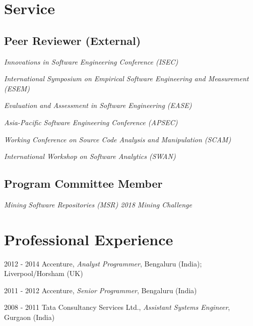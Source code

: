 \documentclass[12pt,letterpaper]{article}
\newcommand{\listitemspace}{0.15em}
\renewenvironment{itemize}
{\begin{list}{}{\setlength{\leftmargin}{0em}
				\setlength{\parskip}{0em}
				\setlength{\itemsep}{\listitemspace}
				\setlength{\parsep}{\listitemspace}}}
{\end{list}}
\begin{document}
\section*{Service}

\subsection*{Peer Reviewer (External)}

\begin{itemize}
	
	\item \textit{Innovations in Software Engineering Conference (ISEC)}
	\item \textit{International Symposium on Empirical Software Engineering and Measurement (ESEM)}
	\item \textit{Evaluation and Assessment in Software Engineering (EASE)}
	\item  \textit{Asia-Pacific Software Engineering Conference (APSEC)}	
	\item  \textit{Working Conference on Source Code Analysis and Manipulation (SCAM)}		
	\item  \textit{International Workshop on Software Analytics (SWAN)}
	
	
\end{itemize}

\subsection*{Program Committee Member}
\begin{itemize}
	\item \textit{Mining Software Repositories (MSR) 2018 Mining Challenge}
\end{itemize}

\section*{Professional Experience}


\begin{tablist}	
	\item[2012 - 2014]\tab Accenture, \textit{Analyst Programmer}, Bengaluru (India); Liverpool/Horsham (UK)
	\item[2011 - 2012]\tab Accenture, \textit{Senior Programmer}, Bengaluru (India)
	\item[2008 - 2011] \tab Tata Consultancy Services Ltd., \textit{Assistant Systems Engineer}, Gurgaon (India)
	
\end{tablist}
\end{document}
